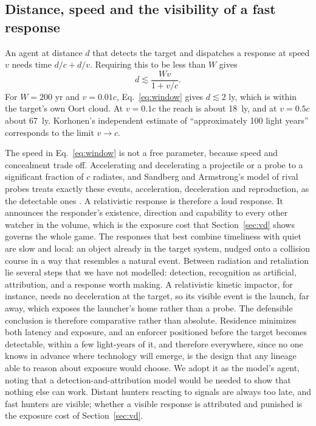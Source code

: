 \documentclass[preprint,12pt]{elsarticle}
\theoremstyle{definition}
\begin{document}
\subsection{Distance, speed and the visibility of a fast response}
\label{sec:distance}

An agent at distance $d$ that detects the target and dispatches a response at speed $v$ needs time $d/c + d/v$. Requiring this to be less than $W$ gives
\begin{equation}
d \lesssim \frac{W v}{1 + v/c} .
\label{eq:window}
\end{equation}
For $W = 200$ yr and $v = 0.01c$, Eq.~\eqref{eq:window} gives $d \lesssim 2$ ly, which is within the target's own Oort cloud. At $v = 0.1c$ the reach is about 18~ly, and at $v = 0.5c$ about 67~ly. Korhonen's independent estimate of ``approximately 100 light years'' corresponds to the limit $v \to c$.

The speed in Eq.~\eqref{eq:window} is not a free parameter, because speed and concealment trade off. Accelerating and decelerating a projectile or a probe to a significant fraction of $c$ radiates, and Sandberg and Armstrong's model of rival probes treats exactly these events, acceleration, deceleration and reproduction, as the detectable ones \citep{SandbergArmstrong2013}. A relativistic response is therefore a loud response. It announces the responder's existence, direction and capability to every other watcher in the volume, which is the exposure cost that Section~\ref{sec:vd} shows governs the whole game. The responses that best combine timeliness with quiet are slow and local: an object already in the target system, nudged onto a collision course in a way that resembles a natural event. Between radiation and retaliation lie several steps that we have not modelled: detection, recognition as artificial, attribution, and a response worth making. A relativistic kinetic impactor, for instance, needs no deceleration at the target, so its visible event is the launch, far away, which exposes the launcher's home rather than a probe. The defensible conclusion is therefore comparative rather than absolute. Residence minimizes both latency and exposure, and an enforcer positioned before the target becomes detectable, within a few light-years of it, and therefore everywhere, since no one knows in advance where technology will emerge, is the design that any lineage able to reason about exposure would choose. We adopt it as the model's agent, noting that a detection-and-attribution model would be needed to show that nothing else can work. Distant hunters reacting to signals are always too late, and fast hunters are visible; whether a visible response is attributed and punished is the exposure cost of Section~\ref{sec:vd}.
\end{document}
